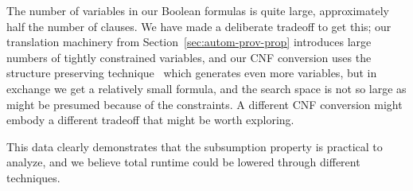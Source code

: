 The number of variables in our Boolean formulas is quite large,
approximately half the number of clauses.  We have made a deliberate
tradeoff to get this; our translation machinery from
Section~\ref{sec:autom-prov-prop} introduces large numbers of tightly
constrained variables, and our CNF conversion uses the structure
preserving technique~\cite{XXX} which generates even more variables,
but in exchange we get a relatively small formula, and the search
space is not so large as might be presumed because of the constraints.
A different CNF conversion might embody a different tradeoff that
might be worth exploring.

This data clearly demonstrates that the subsumption property is
practical to analyze, and we believe total runtime could be lowered
through different techniques.


